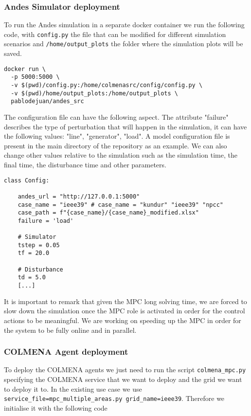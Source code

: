 \documentclass{article}
\begin{document}
\subsubsection*{Andes Simulator deployment}

To run the Andes simulation in a separate docker container we run the following code, with \texttt{config.py} the file that can be modified for different simulation scenarios and \texttt{/home/output\_plots} the folder where the simulation plots will be saved. 

\begin{verbatim}
docker run \
  -p 5000:5000 \
  -v $(pwd)/config.py:/home/colmenasrc/config/config.py \
  -v $(pwd)/home/output_plots:/home/output_plots \
  pablodejuan/andes_src

\end{verbatim}

The configuration file can have the following aspect. The attribute "failure" describes the type of perturbation that will happen in the simulation, it can have the following values: "line", "generator", "load". A model configuration file is present in the main directory of the repository as an example. We can also change other values relative to the simulation such as the simulation time, the final time, the disturbance time and other parameters. 

\begin{verbatim}
class Config:

    andes_url = "http://127.0.0.1:5000" 
    case_name = "ieee39" # case_name = "kundur" "ieee39" "npcc"
    case_path = f"{case_name}/{case_name}_modified.xlsx" 
    failure = 'load'

    # Simulator 
    tstep = 0.05
    tf = 20.0

    # Disturbance 
    td = 5.0
    [...]
\end{verbatim}

It is important to remark that given the MPC long solving time, we are forced to slow down the simulation once the MPC role is activated in order for the control actions to be meaningful. We are working on speeding up the MPC in order for the system to be fully online and in parallel.

\subsubsection*{COLMENA Agent deployment}

To deploy the COLMENA agents we just need to run the script \texttt{colmena\_mpc.py} specifying the COLMENA service that we want to deploy and the grid we want to deploy it to. In the existing use case we use \texttt{service\_file=mpc\_multiple\_areas.py grid\_name=ieee39}. Therefore we initialise it with the following code
\end{document}
